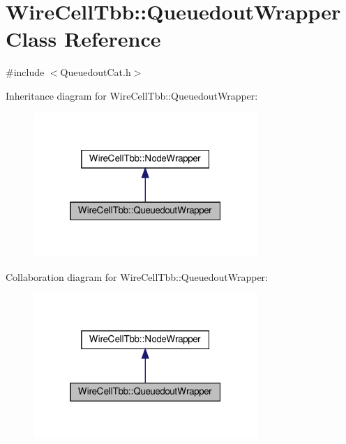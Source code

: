 \hypertarget{class_wire_cell_tbb_1_1_queuedout_wrapper}{}\section{Wire\+Cell\+Tbb\+:\+:Queuedout\+Wrapper Class Reference}
\label{class_wire_cell_tbb_1_1_queuedout_wrapper}


{\ttfamily \#include $<$Queuedout\+Cat.\+h$>$}



Inheritance diagram for Wire\+Cell\+Tbb\+:\+:Queuedout\+Wrapper\+:
\nopagebreak
\begin{figure}[H]
\begin{center}
\leavevmode
\includegraphics[width=241pt]{class_wire_cell_tbb_1_1_queuedout_wrapper__inherit__graph}
\end{center}
\end{figure}


Collaboration diagram for Wire\+Cell\+Tbb\+:\+:Queuedout\+Wrapper\+:
\nopagebreak
\begin{figure}[H]
\begin{center}
\leavevmode
\includegraphics[width=241pt]{class_wire_cell_tbb_1_1_queuedout_wrapper__coll__graph}
\end{center}
\end{figure}
